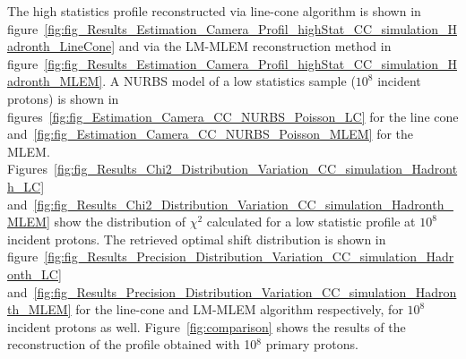 The high statistics profile reconstructed via line-cone algorithm is shown in figure~\ref{fig:fig_Results_Estimation_Camera_Profil_highStat_CC_simulation_Hadronth_LineCone} and via the LM-MLEM reconstruction method in figure~\ref{fig:fig_Results_Estimation_Camera_Profil_highStat_CC_simulation_Hadronth_MLEM}. A NURBS model of a low statistics sample ($10^8$ incident protons) is shown in figures~\ref{fig:fig_Estimation_Camera_CC_NURBS_Poisson_LC} for the line cone and~\ref{fig:fig_Estimation_Camera_CC_NURBS_Poisson_MLEM} for the MLEM.
Figures~\ref{fig:fig_Results_Chi2_Distribution_Variation_CC_simulation_Hadronth_LC} and~\ref{fig:fig_Results_Chi2_Distribution_Variation_CC_simulation_Hadronth_MLEM} show the distribution of $\chi^2$ calculated for a low statistic profile at $10^8$ incident protons. The retrieved optimal shift distribution is shown in figure~\ref{fig:fig_Results_Precision_Distribution_Variation_CC_simulation_Hadronth_LC} and~\ref{fig:fig_Results_Precision_Distribution_Variation_CC_simulation_Hadronth_MLEM} for the line-cone and LM-MLEM algorithm respectively, for $10^8$ incident protons as well.
Figure~\ref{fig:comparison} shows the results of the reconstruction of the profile obtained with 10$^8$ primary protons.


